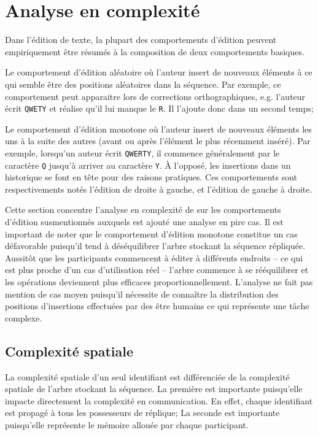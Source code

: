 
\section{Analyse en complexité}
\label{repl:sec:complexity}

Dans l'édition de texte, la plupart des comportements d'édition peuvent
empiriquement être résumés à la composition de deux comportements basiques.
\begin{inparaenum}
\item Le comportement d'édition aléatoire où l'auteur insert de nouveaux
  éléments à ce qui semble être des positions aléatoires dans la séquence. Par
  exemple, ce comportement peut apparaitre lors de corrections orthographiques,
  e.g. l'auteur écrit \texttt{QWETY} et réalise qu'il lui manque le
  \texttt{R}. Il l'ajoute donc dans un second temps;
\item Le comportement d'édition monotone où l'auteur insert de nouveaux éléments
  les uns à la suite des autres (avant ou après l'élément le plus récemment
  inséré). Par exemple, lorsqu'un auteur écrit \texttt{QWERTY}, il commence
  généralement par le caractère \texttt{Q} jusqu'à arriver au caractère
  \texttt{Y}. À l'opposé, les insertions dans un historique se font en tête pour
  des raisons pratiques. Ces comportements sont respectivements notés l'édition
  de droite à gauche, et l'édition de gauche à droite.
\end{inparaenum}

Cette section concentre l'analyse en complexité de \LSEQ sur les comportements
d'édition susmentionnés auxquels est ajouté une analyse en pire cas. Il est
important de noter que le comportement d'édition monotone constitue un cas
défavorable puisqu'il tend à déséquilibrer l'arbre stockant la séquence
répliquée. Aussitôt que les participants commencent à éditer à différents
endroits -- ce qui est plus proche d'un cas d'utilisation réel -- l'arbre
commence à se rééquilibrer et les opérations deviennent plus efficaces
proportionnellement. L'analyse ne fait pas mention de cas moyen puisqu'il
nécessite de connaître la distribution des positions d'insertions effectuées par
des être humains ce qui représente une tâche complexe.

\subsection{Complexité spatiale}

La complexité spatiale d'un seul identifiant est différenciée de la complexité
spatiale de l'arbre stockant la séquence. La première est importante puisqu'elle
impacte directement la complexité en communication. En effet, chaque identifiant
est propagé à tous les possesseurs de réplique; La seconde est importante
puisqu'elle représente le mémoire allouée par chaque participant.

